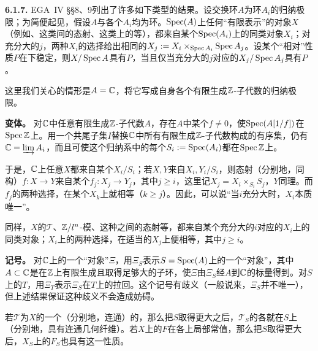 \par\medskip\noindent\textbf{6.1.7.} EGA~IV §§8、9列出了许多如下类型的结果。设交换环$A$为环$A_i$的归纳极限；为简便起见，假设$A$与各个$A_i$均为环。$\operatorname{Spec}(A)$上任何“有限表示”的对象$X$（例如、这类间的态射、这类上的等），都来自某个$\operatorname{Spec}(A_i)$上的同类对象$X_i$；对充分大的$j$，两种$X_i$的选择给出相同的$X_j:=X_i\times_{\operatorname{Spec} A_i}\operatorname{Spec} A_j$。设某个“相对”性质$P$在下稳定，则$X/\operatorname{Spec} A$具有$P$，当且仅当充分大的$j$对应的$X_j/\operatorname{Spec} A_j$具有$P$。

这里我们关心的情形是$A=\mathbb C$，将它写成自身各个有限生成$\mathbb Z$-子代数的归纳极限。

\noindent\textbf{变体。} 对$\mathbb C$中任意有限生成$\mathbb Z$-子代数$A$，存在$A$中某个$f\ne0$，使$\operatorname{Spec}(A[1/f])$在$\operatorname{Spec}\mathbb Z$上。用一个共尾子集$I$替换$\mathbb C$中所有有限生成$\mathbb Z$-子代数构成的有序集，仍有$\mathbb C=\varinjlim A_i$，而且可使这个归纳系中的每个$S_i:=\operatorname{Spec}(A_i)$都在$\operatorname{Spec}\mathbb Z$上。

于是，$\mathbb C$上任意$X$都来自某个$X_i/S_i$；若$X,Y$来自$X_i,Y_i/S_i$，则态射（分别地，同构）$f:X\to Y$来自某个$f_j:X_j\to Y_j$，其中$j\ge i$，这里记$X_j=X_i\times_{S_i}S_j$，$Y$同理。而$f_j$的两种选择，在某个$X_k$上就相等（$k\ge j$）。因此，可以说“当$i$充分大时，$X_i$本质唯一”。

同样，$X$的$\mathcal T$、$\mathbb Z/l^n$-模、这种之间的态射等，都来自某个充分大的$i$对应的$X_i$上的同类对象；$X_i$上的两种选择，在适当的$X_j$上便相等，其中$j\ge i$。

\noindent\textbf{记号。} 对$\mathbb C$上的一个“对象”$\Xi$，用$\Xi_S$表示$S=\operatorname{Spec}(A)$上的一个“对象”，其中$A\subset\mathbb C$是在$\mathbb Z$上有限生成且取得足够大的子环，使$\Xi$由$\Xi_S$经$A$到$\mathbb C$的标量得到。对$S$上的$T$，用$\Xi_T$表示$\Xi_S$在$T$上的拉回。这个记号有歧义（一般说来，$\Xi_S$并不唯一），但上述结果保证这种歧义不会造成妨碍。

若$\mathcal T$为$X$的一个（分别地，连通）的，那么把$S$取得更大之后，$\mathcal T_S$的各就在$S$上（分别地，具有连通几何纤维）。若$X$上的$F$在各上局部常值，那么把$S$取得更大后，$X_S$上的$F_S$也具有这一性质。

